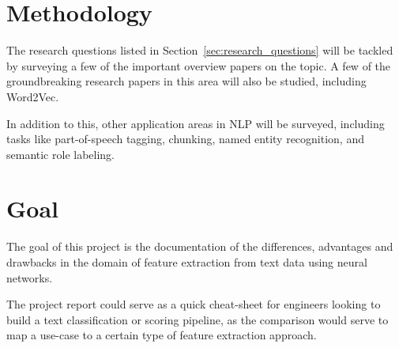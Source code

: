 \documentclass[parskip=half]{scrartcl}
\begin{document}

\section{Methodology} %
\label{sec:methodology}

    The research questions listed in Section~\ref{sec:research_questions} will be tackled by surveying a few of the important overview papers on the topic\cite{goldberg2016primer}\cite{bengio2003neural}\cite{morin2005hierarchical}. A few of the groundbreaking research papers in this area will also be studied, including Word2Vec\cite{mikolov2013efficient}\cite{mikolov2013distributed}\cite{mikolov2013linguistic}.

    In addition to this, other application areas in NLP will be surveyed, including tasks like part-of-speech tagging, chunking, named entity recognition, and semantic role labeling. \cite{socher2011parsing}\cite{luong2013better}\cite{maas2015lexicon}\cite{li2015hierarchical}\cite{collobert2011natural}\cite{pennington2014glove}



\section{Goal} %
\label{sec:goal}

    The goal of this project is the documentation of the differences, advantages and drawbacks in the domain of feature extraction from text data using neural networks. 

    The project report could serve as a quick cheat-sheet for engineers looking to build a text classification or scoring pipeline, as the comparison would serve to map a use-case to a certain type of feature extraction approach.





\end{document}
